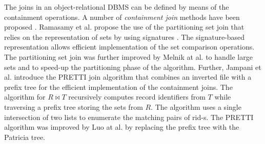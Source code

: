 The joins in an object-relational DBMS can be defined by means of the containment operations. A number of \emph{containment join} methods have been proposed \cite{Ramasamy2000,Melnik2003,Jampani2005,Luo2015}. Ramasamy et al. propose the use of the partitioning set join that relies on the representation of sets by using signatures \cite{Ramasamy2000}. The signature-based representation allows efficient implementation of the set comparison operations. The partitioning set join was further improved by Melnik at al. \cite{Melnik2003} to handle large sets and to speed-up the partitioning phase of the algorithm. Further, Jampani et al. introduce the PRETTI join algorithm that combines an inverted file with a prefix tree for the efficient implementation of the containment joins. The algorithm for $R\bowtie T$ recursively computes record identifiers from $T$ while traversing a prefix tree storing the sets from $R$. The algorithm uses a single intersection of two lists to enumerate the matching pairs of rid-s. The PRETTI algorithm was improved by Luo at al. \cite{Luo2015} by replacing the prefix tree with the Patricia tree. 
